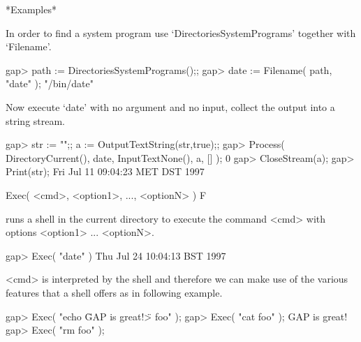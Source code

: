*Examples*

In   order to  find   a  system program  use  `DirectoriesSystemPrograms'
together with `Filename'.

\begintt
gap> path := DirectoriesSystemPrograms();;
gap> date := Filename( path, "date" );
"/bin/date"
\endtt

Now execute `date' with no argument and no input, collect the output into
a string stream.

\begintt
gap> str := "";; a := OutputTextString(str,true);;
gap> Process( DirectoryCurrent(), date, InputTextNone(), a, [] );
0
gap> CloseStream(a);
gap> Print(str);   
Fri Jul 11 09:04:23 MET DST 1997
\endtt


\>Exec( <cmd>, <option1>, ..., <optionN> ) F

runs a shell in the  current directory to execute  the command <cmd> with
options <option1> ... <optionN>.

\begintt
gap> Exec( "date" )
Thu Jul 24 10:04:13 BST 1997
\endtt

<cmd> is  interpreted by the shell  and therefore we  can make use of the
various features that a shell offers as in following example.

\beginexample
gap> Exec( "echo \"GAP is great!\" > foo" );    
gap> Exec( "cat foo" );
GAP is great!
gap> Exec( "rm foo" );
\endexample

